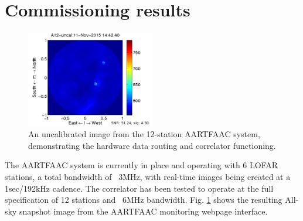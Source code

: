 \documentclass{ws-jai}
\begin{document}
\section {\label{sec:results} Commissioning results}
\begin{figure}[htbp]
   \includegraphics[width=0.5\textwidth]{Figs/A12_uncal.png}
\caption{An uncalibrated image from the 12-station AARTFAAC system, demonstrating the hardware data routing and  correlator functioning.}
\label{fig:afaac_results}
\end{figure}
The AARTFAAC system is currently in place and operating with 6 LOFAR stations, a
total bandwidth of  ~3MHz, with real-time images being created  at a 1sec/192kHz
cadence. The correlator has been tested  to operate at the full specification of
12  stations  and  ~6MHz  bandwidth.  Fig.   \ref{fig:afaac_results}  shows  the
resulting All-sky snapshot image from the AARTFAAC monitoring webpage interface.

\end{document}
